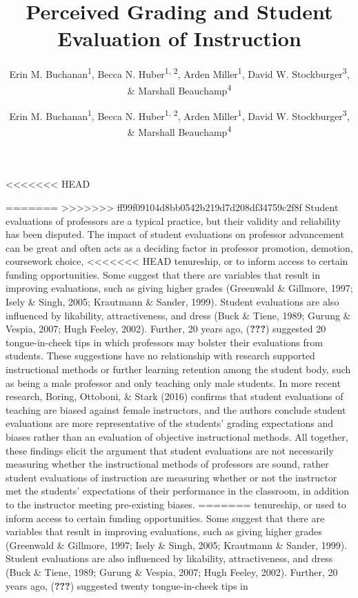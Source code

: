\documentclass[,man]{apa6}
\title{Perceived Grading and Student Evaluation of Instruction}
\author{Erin M. Buchanan\textsuperscript{1}, Becca N.
Huber\textsuperscript{1, 2}, Arden Miller\textsuperscript{1}, David W.
Stockburger\textsuperscript{3}, \& Marshall Beauchamp\textsuperscript{4}}
\date{}
\affiliation{
\vspace{0.5cm}
\textsuperscript{1} Missouri State University\\\textsuperscript{2} Idaho State University\\\textsuperscript{3} US Air Force Academy\\\textsuperscript{4} University of Missouri - Kansas City}
\author{Erin M. Buchanan\textsuperscript{1}, Becca N. Huber\textsuperscript{1, 2}, Arden Miller\textsuperscript{1}, David W. Stockburger\textsuperscript{3}, \& Marshall Beauchamp\textsuperscript{4}}
\affiliation{
    \vspace{0.5cm}
          \textsuperscript{1} Missouri State University\\
          \textsuperscript{2} Idaho State University\\
          \textsuperscript{3} US Air Force Academy\\
          \textsuperscript{4} University of Missouri - Kansas City  }
\newcounter{author}
\theoremstyle{definition}
\theoremstyle{definition}
\theoremstyle{definition}
\theoremstyle{remark}
\begin{document}
\maketitle

<<<<<<< HEAD
\setcounter{secnumdepth}{0}



=======
>>>>>>> ff99f09104d8bb0542b219d7d208df34759c2f8f
Student evaluations of professors are a typical practice, but their
validity and reliability has been disputed. The impact of student
evaluations on professor advancement can be great and often acts as a
deciding factor in professor promotion, demotion, coursework choice,
<<<<<<< HEAD
tenureship, or to inform access to certain funding opportunities. Some
suggest that there are variables that result in improving evaluations,
such as giving higher grades (Greenwald \& Gillmore, 1997; Isely \&
Singh, 2005; Krautmann \& Sander, 1999). Student evaluations are also
influenced by likability, attractiveness, and dress (Buck \& Tiene,
1989; Gurung \& Vespia, 2007; Hugh Feeley, 2002). Further, 20 years ago,
({\textbf{???}}) suggested 20 tongue-in-cheek tips in which professors
may bolster their evaluations from students. These suggestions have no
relationship with research supported instructional methods or further
learning retention among the student body, such as being a male
professor and only teaching only male students. In more recent research,
Boring, Ottoboni, \& Stark (2016) confirms that student evaluations of
teaching are biased against female instructors, and the authors conclude
student evaluations are more representative of the students' grading
expectations and biases rather than an evaluation of objective
instructional methods. All together, these findings elicit the argument
that student evaluations are not necessarily measuring whether the
instructional methods of professors are sound, rather student
evaluations of instruction are measuring whether or not the instructor
met the students' expectations of their performance in the classroom, in
addition to the instructor meeting pre-existing biases.
=======
tenureship, or used to inform access to certain funding opportunities.
Some suggest that there are variables that result in improving
evaluations, such as giving higher grades (Greenwald \& Gillmore, 1997;
Isely \& Singh, 2005; Krautmann \& Sander, 1999). Student evaluations
are also influenced by likability, attractiveness, and dress (Buck \&
Tiene, 1989; Gurung \& Vespia, 2007; Hugh Feeley, 2002). Further, 20
years ago, ({\textbf{???}}) suggested twenty tongue-in-cheek tips in
\end{document}

